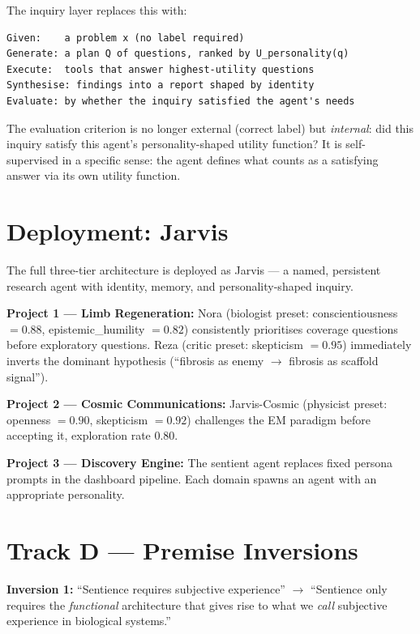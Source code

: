 \documentclass[11pt,a4paper]{article}
\begin{document}
The inquiry layer replaces this with:
\begin{lstlisting}
Given:    a problem x (no label required)
Generate: a plan Q of questions, ranked by U_personality(q)
Execute:  tools that answer highest-utility questions
Synthesise: findings into a report shaped by identity
Evaluate: by whether the inquiry satisfied the agent's needs
\end{lstlisting}

The evaluation criterion is no longer external (correct label) but \textit{internal}: did
this inquiry satisfy this agent's personality-shaped utility function? It is
self-supervised in a specific sense: the agent defines what counts as a satisfying answer
via its own utility function.

\section{Deployment: Jarvis}

The full three-tier architecture is deployed as Jarvis — a named, persistent research
agent with identity, memory, and personality-shaped inquiry.

\textbf{Project 1 — Limb Regeneration:} Nora (biologist preset: conscientiousness $=
0.88$, epistemic\_humility $= 0.82$) consistently prioritises coverage questions before
exploratory questions. Reza (critic preset: skepticism $= 0.95$) immediately inverts the
dominant hypothesis (``fibrosis as enemy $\to$ fibrosis as scaffold signal'').

\textbf{Project 2 — Cosmic Communications:} Jarvis-Cosmic (physicist preset: openness $=
0.90$, skepticism $= 0.92$) challenges the EM paradigm before accepting it, exploration
rate 0.80.

\textbf{Project 3 — Discovery Engine:} The sentient agent replaces fixed persona prompts
in the dashboard pipeline. Each domain spawns an agent with an appropriate personality.

\section{Track D — Premise Inversions}

\textbf{Inversion 1:} ``Sentience requires subjective experience'' $\to$ ``Sentience only
requires the \textit{functional} architecture that gives rise to what we \textit{call}
subjective experience in biological systems.''
\end{document}

